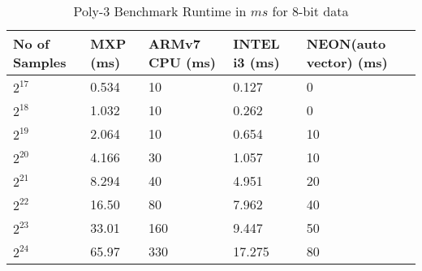 \begin{table}[htbp]
	\centering
	\begin{adjustbox}{width=.9\textwidth}
		\small
	\begin{tabular}{lllll}
		\toprule
		\textbf{No of Samples} & \textbf{MXP (ms)} & \textbf{ARMv7 CPU (ms)} & \textbf{INTEL i3 (ms)} & \textbf{NEON(auto vector) (ms)} \\
		\midrule
		$2^{17}$ & 0.534 & 10 & 0.127 & 0 \\
		$2^{18}$ & 1.032 & 10 & 0.262 & 0 \\
		$2^{19}$ & 2.064 & 10 & 0.654 & 10 \\
		$2^{20}$ & 4.166 & 30 & 1.057 & 10 \\
		$2^{21}$ & 8.294 & 40 & 4.951 & 20 \\
		$2^{22}$ & 16.50 & 80 & 7.962 & 40 \\
		$2^{23}$ & 33.01 & 160 & 9.447 & 50 \\
		$2^{24}$ & 65.97 & 330 & 17.275 & 80 \\
		
		\bottomrule
	\end{tabular}%
     \end{adjustbox}%
      \caption{Poly-3 Benchmark Runtime in $ms$ for 8-bit data}
	\label{y:21}%
\end{table}%
